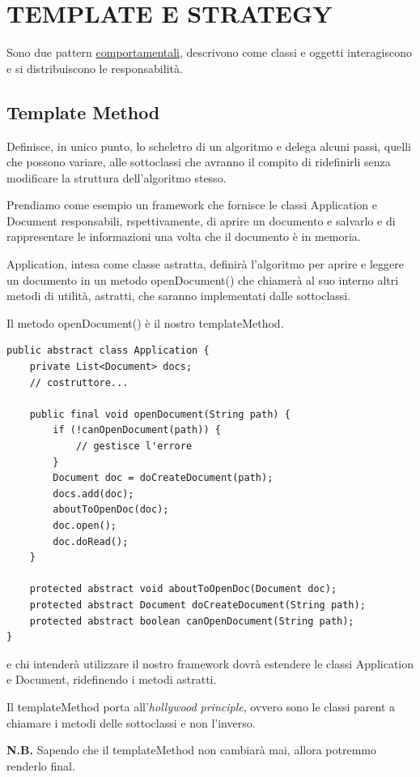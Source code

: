 \chapter{TEMPLATE E STRATEGY}
Sono due pattern \underline{comportamentali}, descrivono come classi e oggetti interagiscono e si distribuiscono le responsabilità.

\section{Template Method}
Definisce, in unico punto, lo scheletro di un algoritmo e delega alcuni passi, quelli che possono variare, alle sottoclassi che avranno il compito di ridefinirli senza
modificare la struttura dell'algoritmo stesso.

Prendiamo come esempio un framework che fornisce le classi Application e Document responsabili, rspettivamente, di aprire un documento e salvarlo e di rappresentare 
le informazioni una volta che il documento è in memoria.

Application, intesa come classe astratta, definirà l’algoritmo per aprire e leggere un documento in un metodo openDocument() che chiamerà al suo interno altri metodi 
di utilità, astratti, che saranno implementati dalle sottoclassi.

Il metodo openDocument() è il nostro templateMethod.
\begin{lstlisting}
public abstract class Application {
    private List<Document> docs;
    // costruttore...
    
    public final void openDocument(String path) {
        if (!canOpenDocument(path)) {
            // gestisce l'errore
        }
        Document doc = doCreateDocument(path);
        docs.add(doc);
        aboutToOpenDoc(doc);
        doc.open();
        doc.doRead();
    }

    protected abstract void aboutToOpenDoc(Document doc);
    protected abstract Document doCreateDocument(String path);
    protected abstract boolean canOpenDocument(String path);
}
\end{lstlisting}

e chi intenderà utilizzare il nostro framework dovrà estendere le classi Application e Document, ridefinendo i metodi astratti.

Il templateMethod porta all'\textit{hollywood principle}, ovvero sono le classi parent a chiamare i metodi delle sottoclassi e non l'inverso. 

\medskip
\textbf{N.B.} Sapendo che il templateMethod non cambiarà mai, allora potremmo renderlo final.


